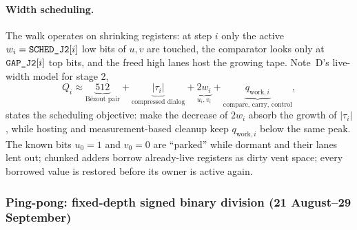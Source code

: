 \paragraph{Width scheduling.} The walk operates on shrinking registers: at step $i$ only the active $w_i=\texttt{SCHED\_J2}[i]$ low bits of $u,v$ are touched, the comparator looks only at $\texttt{GAP\_J2}[i]$ top bits, and the freed high lanes host the growing tape. Note~D's live-width model for stage 2,
\begin{equation}\label{eq:livewidth}
Q_i\approx\underbrace{512}_{\text{B\'ezout pair}}+\underbrace{|\tau_i|}_{\text{compressed dialog}}+\underbrace{2w_i}_{u_i,v_i}+\underbrace{q_{\mathrm{work},i}}_{\text{compare, carry, control}},
\end{equation}
states the scheduling objective: make the decrease of $2w_i$ absorb the growth of $|\tau_i|$, while hosting and measurement-based cleanup keep $q_{\mathrm{work},i}$ below the same peak. The known bits $u_0=1$ and $v_0=0$ are ``parked'' while dormant and their lanes lent out; chunked adders borrow already-live registers as dirty vent space; every borrowed value is restored before its owner is active again.

\subsubsection{Ping-pong: fixed-depth signed binary division (21 August--29 September)}\label{sec:pingpong}

